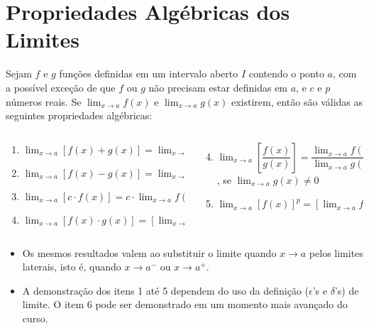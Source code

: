 \section{Propriedades Algébricas dos Limites}

\begin{frame}
  \begin{theorem}
    Sejam $f$ e $g$ funções definidas em um intervalo aberto $I$ contendo o ponto $a$, com a possível exceção de que $f$ ou $g$ não precisam estar definidas em $a$, e $c$ e $p$ números reais. Se $\lim_{x\rightarrow a}{f(x)}$ e $\lim_{x\rightarrow a}{g(x)}$ existirem, então são válidas as seguintes propriedades algébricas:
    \begin{columns}[onlytextwidth]
    \begin{column}{0.49\textwidth}
      \begin{enumerate}\small
        \item $\displaystyle\lim_{x\rightarrow a}\left[f(x)+g(x)\right]=\lim_{x\rightarrow a}{f(x)}+\lim_{x\rightarrow a}{g(x)}$
        \item $\displaystyle\lim_{x\rightarrow a}\left[f(x)-g(x)\right]=\lim_{x\rightarrow a}{f(x)}-\lim_{x\rightarrow a}{g(x)}$
        \item $\displaystyle\lim_{x\rightarrow a}[c\cdot f(x)]=c\cdot\lim_{x\rightarrow a}{f(x)}$
        \item $\displaystyle\lim_{x\rightarrow a}\left[f(x)\cdot g(x)\right]=\left[\lim_{x\rightarrow a}{f(x)}\right]\cdot\left[\lim_{x\rightarrow a}{g(x)}\right]$
      \end{enumerate}
    \end{column}
    \begin{column}{0.49\textwidth}
      \begin{enumerate}\setcounter{enumi}{3}\small
        \item $\displaystyle\lim_{x\rightarrow a}\left[\dfrac{f(x)}{g(x)}\right]=\dfrac{\displaystyle\lim_{x\rightarrow a}{f(x)}}{\displaystyle\lim_{x\rightarrow a}{g(x)}}$, se $\displaystyle\lim_{x\rightarrow a}{g(x)}\not= 0$
        \item $\displaystyle\lim_{x\rightarrow a}\left[f(x)\right]^{p}=\left[\lim_{x\rightarrow a}{f(x)}\right]^{p}$
      \end{enumerate}
    \end{column}
  \end{columns}
  \end{theorem}
  \begin{itemize}\small
    \item Os mesmos resultados valem ao substituir o limite quando $x\rightarrow a$ pelos limites laterais, isto é, quando $x\rightarrow a^{-}$ ou $x\rightarrow a^{+}$.
    \item A demonstração dos itens 1 até 5 dependem do uso da definição ($\epsilon$'s e $\delta$'s) de limite. O item 6 pode ser demonstrado em um momento mais avançado do curso.
  \end{itemize}
\end{frame}

